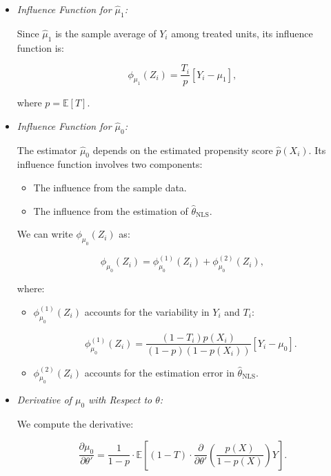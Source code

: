 \documentclass{article}
\begin{document}
\begin{itemize}
    \item \textit{Influence Function for \( \hat{\mu}_1 \):}

    Since \( \hat{\mu}_1 \) is the sample average of \( Y_i \) among treated units, its influence function is:

    \[
    \phi_{\mu_1}(Z_i) = \frac{T_i}{p} [Y_i - \mu_1],
    \]

    where \( p = \mathbb{E}[T] \).

    \item \textit{Influence Function for \( \hat{\mu}_0 \):}

    The estimator \( \hat{\mu}_0 \) depends on the estimated propensity score \( \hat{p}(X_i) \). Its influence function involves two components:

    \begin{itemize}
        \item The influence from the sample data.
        \item The influence from the estimation of \( \hat{\theta}_{\text{NLS}} \).
    \end{itemize}

    We can write \( \phi_{\mu_0}(Z_i) \) as:

    \[
    \phi_{\mu_0}(Z_i) = \phi_{\mu_0}^{(1)}(Z_i) + \phi_{\mu_0}^{(2)}(Z_i),
    \]

    where:

    \begin{itemize}
        \item \( \phi_{\mu_0}^{(1)}(Z_i) \) accounts for the variability in \( Y_i \) and \( T_i \):
        
        \[
        \phi_{\mu_0}^{(1)}(Z_i) = \frac{(1 - T_i) p(X_i)}{(1 - p)(1 - p(X_i))} [Y_i - \mu_0].
        \]

        \item \( \phi_{\mu_0}^{(2)}(Z_i) \) accounts for the estimation error in \( \hat{\theta}_{\text{NLS}} \).
    \end{itemize}

    \item \textit{Derivative of \( \mu_0 \) with Respect to \( \theta \):}

    We compute the derivative:

    \[
    \frac{\partial \mu_0}{\partial \theta'} = \frac{1}{1 - p} \cdot \mathbb{E}\left[ (1 - T) \cdot \frac{\partial}{\partial \theta'}\left( \frac{p(X)}{1 - p(X)} \right) Y \right].
    \]


\end{itemize}
\end{document}
